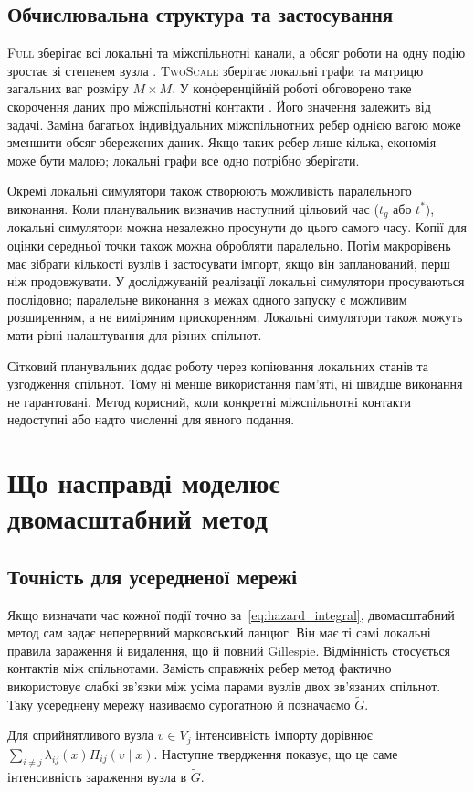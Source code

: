 \documentclass[a4paper,fleqn]{cas-sc}
\newcommand{\Full}{\textup{\textsc{Full}}}
\newcommand{\TS}{\textup{\textsc{TwoScale}}}
\begin{document}
\subsection{Обчислювальна структура та застосування}
\label{sec:cost}

\Full{} зберігає всі локальні та міжспільнотні канали, а обсяг роботи на одну подію зростає зі степенем вузла \citep{kuryliak2025simulating}. \TS{} зберігає локальні графи та матрицю загальних ваг розміру $M\times M$. У конференційній роботі обговорено таке скорочення даних про міжспільнотні контакти \citep{kuryliak2025towards}. Його значення залежить від задачі. Заміна багатьох індивідуальних міжспільнотних ребер однією вагою може зменшити обсяг збережених даних. Якщо таких ребер лише кілька, економія може бути малою; локальні графи все одно потрібно зберігати.

Окремі локальні симулятори також створюють можливість паралельного виконання. Коли планувальник визначив наступний цільовий час ($t_g$ або $t^\ast$), локальні симулятори можна незалежно просунути до цього самого часу. Копії для оцінки середньої точки також можна обробляти паралельно. Потім макрорівень має зібрати кількості вузлів і застосувати імпорт, якщо він запланований, перш ніж продовжувати. У досліджуваній реалізації локальні симулятори просуваються послідовно; паралельне виконання в межах одного запуску є можливим розширенням, а не виміряним прискоренням. Локальні симулятори також можуть мати різні налаштування для різних спільнот.

Сітковий планувальник додає роботу через копіювання локальних станів та узгодження спільнот. Тому ні менше використання пам'яті, ні швидше виконання не гарантовані. Метод корисний, коли конкретні міжспільнотні контакти недоступні або надто численні для явного подання.



\section{Що насправді моделює двомасштабний метод}
\label{sec:analysis}

\subsection{Точність для усередненої мережі}
\label{sec:surrogate}

Якщо визначати час кожної події точно за~\eqref{eq:hazard_integral}, двомасштабний метод сам задає неперервний марковський ланцюг. Він має ті самі локальні правила зараження й видалення, що й повний Gillespie. Відмінність стосується контактів між спільнотами. Замість справжніх ребер метод фактично використовує слабкі зв'язки між усіма парами вузлів двох зв'язаних спільнот. Таку усереднену мережу називаємо сурогатною й позначаємо $\tilde G$.
\par Для сприйнятливого вузла $v\in V_j$ інтенсивність імпорту дорівнює $\sum_{i\neq j}\lambda_{ij}(x)\Pi_{ij}(v\mid x)$. Наступне твердження показує, що це саме інтенсивність зараження вузла в $\tilde G$.
\end{document}
